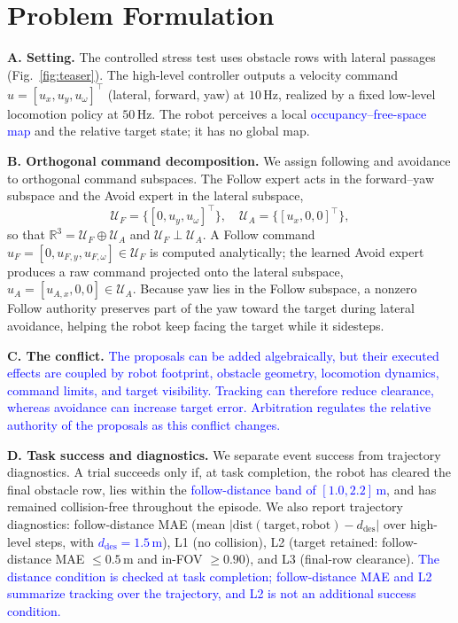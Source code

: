 \documentclass[letterpaper, 10 pt, conference]{ieeeconf}
\newcommand{\uF}{u_{F}}
\newcommand{\uA}{u_{A}}
\newcommand{\rev}[1]{\textcolor{blue}{#1}}
\begin{document}
\section{Problem Formulation}
\textbf{A. Setting.}
The controlled stress test uses obstacle rows with lateral passages
(Fig.~\ref{fig:teaser}). The
high-level controller outputs a velocity command
$u=[u_x,u_y,u_\omega]^\top$ (lateral, forward, yaw) at $10\,\mathrm{Hz}$,
realized by a fixed low-level locomotion policy at $50\,\mathrm{Hz}$. The
robot perceives a local \rev{occupancy--free-space map} and the relative target state; it
has no global map.

\textbf{B. Orthogonal command decomposition.}
We assign following and avoidance to orthogonal command subspaces. The
Follow expert acts in the forward--yaw subspace and the Avoid expert in
the lateral subspace,
\begin{equation}
\mathcal{U}_F=\{[0,u_y,u_\omega]^\top\},\quad
\mathcal{U}_A=\{[u_x,0,0]^\top\},
\end{equation}
so that $\mathbb{R}^3=\mathcal{U}_F\oplus\mathcal{U}_A$ and
$\mathcal{U}_F\perp\mathcal{U}_A$. A Follow command
$\uF=[0,u_{F,y},u_{F,\omega}]\in\mathcal{U}_F$ is computed analytically;
the learned Avoid expert produces a raw command projected onto the
lateral subspace, $\uA=[u_{A,x},0,0]\in\mathcal{U}_A$. Because yaw lies in
the Follow subspace, a nonzero Follow authority preserves part of the
yaw toward the target during lateral avoidance, helping the robot keep facing
the target while it sidesteps.

\textbf{C. The conflict.}
\rev{The proposals can be added algebraically, but their executed effects are coupled by robot footprint, obstacle geometry, locomotion dynamics, command limits, and target visibility. Tracking can therefore reduce clearance, whereas avoidance can increase target error. Arbitration regulates the relative authority of the proposals as this conflict changes.}

\textbf{D. Task success and diagnostics.}
We separate event success from trajectory diagnostics. A trial succeeds only
if, at task completion, the robot has cleared the final obstacle row, lies
within the \rev{follow-distance band of $[1.0,2.2]\,\mathrm{m}$}, and has remained collision-free throughout the episode. We
also report trajectory diagnostics: follow-distance MAE (mean
$|\mathrm{dist}(\text{target},\text{robot})-d_{\mathrm{des}}|$ over
high-level steps, with \rev{$d_{\mathrm{des}}=1.5\,\mathrm{m}$}), L1 (no collision), L2 (target retained: follow-distance MAE
$\le 0.5\,\mathrm{m}$ and in-FOV $\ge 0.90$), and L3 (final-row clearance). \rev{The distance condition is checked at task completion; follow-distance MAE and L2 summarize tracking over the trajectory, and L2 is not an additional success condition.}
\end{document}
